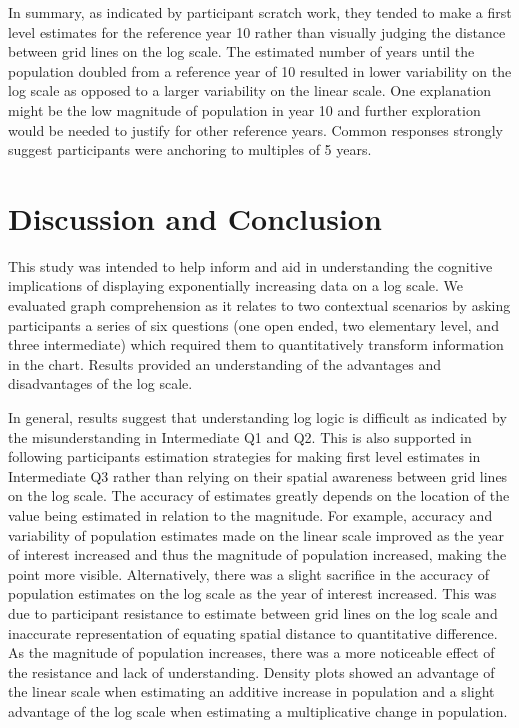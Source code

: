 \documentclass[print]{nuthesis}
\begin{document}
In summary, as indicated by participant scratch work, they tended to make a first level estimates for the reference year 10 rather than visually judging the distance between grid lines on the log scale.
The estimated number of years until the population doubled from a reference year of 10 resulted in lower variability on the log scale as opposed to a larger variability on the linear scale.
One explanation might be the low magnitude of population in year 10 and further exploration would be needed to justify for other reference years.
Common responses strongly suggest participants were anchoring to multiples of 5 years.

\hypertarget{discussion-and-conclusion-2}{%
\section{Discussion and Conclusion}\label{discussion-and-conclusion-2}}

This study was intended to help inform and aid in understanding the cognitive implications of displaying exponentially increasing data on a log scale.
We evaluated graph comprehension as it relates to two contextual scenarios by asking participants a series of six questions (one open ended, two elementary level, and three intermediate) which required them to quantitatively transform information in the chart.
Results provided an understanding of the advantages and disadvantages of the log scale.

In general, results suggest that understanding log logic is difficult as indicated by the misunderstanding in Intermediate Q1 and Q2.
This is also supported in following participants estimation strategies for making first level estimates in Intermediate Q3 rather than relying on their spatial awareness between grid lines on the log scale.
The accuracy of estimates greatly depends on the location of the value being estimated in relation to the magnitude.
For example, accuracy and variability of population estimates made on the linear scale improved as the year of interest increased and thus the magnitude of population increased, making the point more visible.
Alternatively, there was a slight sacrifice in the accuracy of population estimates on the log scale as the year of interest increased.
This was due to participant resistance to estimate between grid lines on the log scale and inaccurate representation of equating spatial distance to quantitative difference.
As the magnitude of population increases, there was a more noticeable effect of the resistance and lack of understanding.
Density plots showed an advantage of the linear scale when estimating an additive increase in population and a slight advantage of the log scale when estimating a multiplicative change in population.
\end{document}
